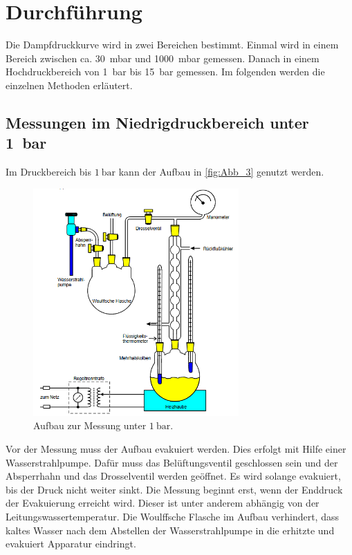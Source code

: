 \section{Durchführung}
\label{sec:Durchführung}

Die Dampfdruckkurve wird in zwei Bereichen bestimmt.
Einmal wird in einem Bereich zwischen ca. \qty{30}{\milli\bar} und \qty{1000}{\milli\bar} gemessen.
Danach in einem Hochdruckbereich von \qty{1}{\bar} bis \qty{15}{\bar} gemessen.
Im folgenden werden die einzelnen Methoden erläutert.

\subsection{Messungen im Niedrigdruckbereich unter \qty{1}{\bar}} %
\label{sub:M_Niedrigdruckbereich}
Im Druckbereich bis $\qty{1}{\bar}$ kann der Aufbau in \autoref{fig:Abb_3} genutzt werden.
\begin{figure}[H]
    \centering
    \includegraphics[width=0.7\textwidth]{build/Abb_3.PNG}
    \caption {Aufbau zur Messung unter $\qty{1}{\bar}$.\cite{V203}}
    \label{fig:Abb_3}
\end{figure}
Vor der Messung muss der Aufbau evakuiert werden.
Dies erfolgt mit Hilfe einer Wasserstrahlpumpe. Dafür muss das Belüftungsventil geschlossen sein und der Absperrhahn und das Drosselventil werden geöffnet.
Es wird solange evakuiert, bis der Druck nicht weiter sinkt. 
Die Messung beginnt erst, wenn der Enddruck der Evakuierung erreicht wird.
Dieser ist unter anderem abhängig von der Leitungswassertemperatur.
Die Woulffsche Flasche im Aufbau verhindert, dass kaltes Wasser nach dem Abstellen der Wasserstrahlpumpe in die erhitzte und evakuiert Apparatur eindringt.
